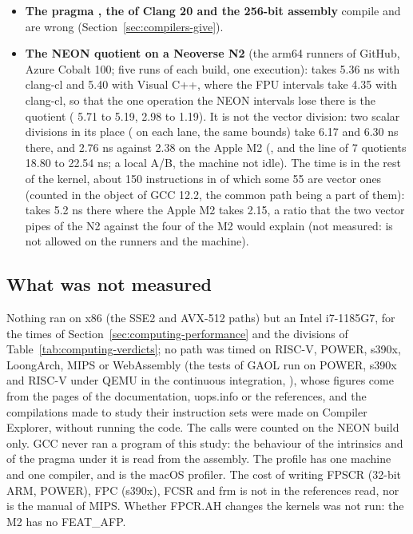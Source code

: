 \documentclass[12pt,a4paper,twoside,openright]{book}
\begin{document}
\begin{itemize}
AVX-512 path does not read MXCSR, and clears them where a test shows them
set; ).  of FPSCR on POWER (non-IEEE mode, where
results ``may be approximate'') and  of the FCSR on MIPS (flush
denormalised results to zero) are states of the same kind that GAOL does not
clear on the FPU intervals of these processors; a path for them would have
to.
\item[$\bullet$] \textbf{The pragma , the
 of Clang 20 and the 256-bit
 assembly} compile and are wrong
(Section~\ref{sec:compilers-give}).
\item[$\bullet$] \textbf{The NEON quotient on a Neoverse N2} (the arm64
runners of GitHub, Azure Cobalt 100; five runs of each build, one
execution):  takes 5.36 ns with clang-cl and 5.40 with Visual
C++, where the FPU intervals take 4.35 with clang-cl, so that the one
operation the NEON intervals lose there is the quotient ( 5.71
to 5.19,  2.98 to 1.19). It is not the vector division: two
scalar divisions in its place ( on each lane, the same
bounds) take 6.17 and 6.30 ns there, and 2.76 ns against 2.38 on the Apple
M2 (, and the line of 7 quotients 18.80 to 22.54 ns; a local
A/B, the machine not idle). The time is in the rest of the kernel, about 150
instructions in  of which some 55 are vector ones
(counted in the object of GCC 12.2, the common path being a part of them):
 takes 5.2 ns there where the Apple M2 takes 2.15, a ratio that
the two vector pipes of the N2 against the four of the M2 would explain (not
measured:  is not allowed on the runners and the machine).
\end{itemize}

\subsection{What was not measured}

Nothing ran on x86 (the SSE2 and AVX-512 paths) but an Intel i7-1185G7, for
the times of Section~\ref{sec:computing-performance} and the divisions of
Table~\ref{tab:computing-verdicts}; no path was timed on RISC-V, POWER, s390x,
LoongArch, MIPS or WebAssembly (the tests of GAOL run on POWER, s390x and
RISC-V under QEMU in the continuous integration, ), whose
figures come from the pages of the documentation, uops.info or the references,
and the compilations made to study their instruction sets were made on
Compiler Explorer, without running the code. The calls
were counted on the NEON build only. GCC never ran a program of this study: the behaviour of the
intrinsics and of the pragma under it is read from the assembly. The profile
has one machine and one compiler, and  is the macOS profiler.
The cost of writing FPSCR (32-bit ARM, POWER), FPC (s390x), FCSR and frm is
not in the references read, nor is the manual of MIPS. Whether FPCR.AH
changes the kernels was not run: the M2 has no FEAT\_AFP.
\end{document}
